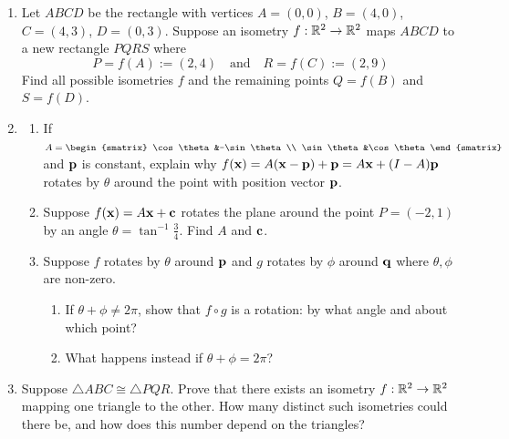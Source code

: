 \begin{exercises}
\begin{enumerate}
	
	  
	  \item Let $ABCD$ be the rectangle with vertices $A=(0,0)$, $B=(4,0)$, $C=(4,3)$, $D=(0,3)$.
		Suppose an isometry $f:\mathbb{R}^2\to\mathbb{R}^2$ maps $ABCD$ to a new rectangle $PQRS$ where
		\[
			P=f(A):=(2,4)\quad \text{and}\quad R=f(C):=(2,9)
		\]
		Find all possible isometries $f$ and the remaining points $Q=f(B)$ and $S=f(D)$.
		
		\item\label{exs:genrotref}\begin{enumerate}
		  \item If $A=
		  \begin{smatrix}
		  	\cos\theta&-\sin\theta\\
		  	\sin\theta&\cos\theta
		  \end{smatrix}$ and ${\mathbf{p}}$ is constant, explain why $f({\mathbf{x}})=A({\mathbf{x}}-{\mathbf{p}})+{\mathbf{p}}=A{\mathbf{x}}+(I-A){\mathbf{p}}$ rotates by $\theta$ around the point with position vector ${\mathbf{p}}$.
		  \item Suppose $f({\mathbf{x}})=A{\mathbf{x}}+{\mathbf{c}}$ rotates the plane around the point $P=(-2,1)$ by an angle $\theta=\tan^{-1}\frac 34$. Find $A$ and ${\mathbf{c}}$.
		  \item Suppose $f$ rotates by $\theta$ around ${\mathbf{p}}$ and $g$ rotates by $\phi$ around ${\mathbf{q}}$ where $\theta,\phi$ are non-zero.
			\begin{enumerate}
		  	\item If $\theta+\phi\neq 2\pi$, show that $f\circ g$ is a rotation: by what angle and about which point?
		  	\item What happens instead if $\theta+\phi=2\pi$?
			\end{enumerate}
		\end{enumerate}
		
		
		\item\label{exs:isocong} Suppose $\triangle ABC\cong\triangle PQR$. Prove that there exists an isometry $f:\mathbb{R}^2\to\mathbb{R}^2$ mapping one triangle to the other. How many distinct such isometries could there be, and how does this number depend on the triangles?
		

\end{enumerate}
\end{exercises}
